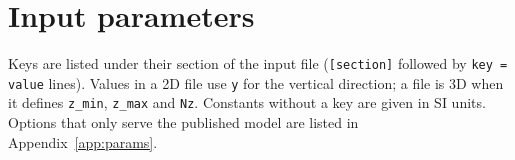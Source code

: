 \documentclass[11pt,a4paper]{article}
\newcommand{\code}[1]{\texttt{#1}}
\begin{document}
\section{Input parameters}\label{sec:params}
Keys are listed under their section of the input file (\code{[section]} followed by \code{key = value}
lines). Values in a 2D file use \code{y} for the vertical direction; a file is 3D when it defines
\code{z\_min}, \code{z\_max} and \code{Nz}. Constants without a key are given in SI units. Options that
only serve the published model are listed in Appendix~\ref{app:params}.

\newcommand{\psec}[1]{\addlinespace[4pt]\multicolumn{3}{l}{\code{[#1]}}\\[1pt]}
\end{document}
